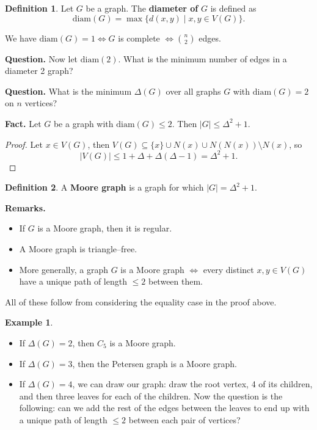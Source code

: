\documentclass{article}
\theoremstyle{definition}
\newtheorem{example}{Example}[section]
\newtheorem{defn}{Definition}[section]
\begin{document}
\begin{defn}
    Let $G$ be a graph. The \textbf{diameter of} $G$ is defined as $$\text{diam}(G) = \max \{d(x,y) \mid x,y \in V(G)\}.$$ 
\end{defn}

We have $\text{diam}(G)=1 \iff G$ is complete $\iff {n\choose{2}}$ edges.
\vspace{1mm}

\textbf{Question.} Now let $\text{diam}(2)$. What is the minimum number of edges in a diameter 2 graph?
\vspace{1mm}

\textbf{Question.} What is the minimum $\Delta(G)$ over all graphs $G$ with $\text{diam}(G)=2$ on $n$ vertices?
\vspace{1mm}

\textbf{Fact.} Let $G$ be a graph with $\text{diam}(G)\le 2$. Then $|G| \le \Delta^2+1$.
\begin{proof}
    Let $x \in V(G)$, then $V(G) \subseteq \{x\} \cup N(x) \cup N(N(x))\setminus N(x)$, so $$|V(G)| \le 1 + \Delta + \Delta(\Delta-1) = \Delta^2+1.$$
\end{proof}
\begin{defn}
    A \textbf{Moore graph} is a graph for which $|G|=\Delta^2+1$.
\end{defn}
\textbf{Remarks.}
\begin{itemize}
    \item If $G$ is a Moore graph, then it is regular.
    \item A Moore graph is triangle--free.
    \item More generally, a graph $G$ is a Moore graph $\iff$ every distinct $x,y \in V(G)$ have a unique path of length $\le 2$ between them. 
\end{itemize} 
All of these follow from considering the equality case in the proof above.
\begin{example}
    \begin{itemize}
        \item If $\Delta(G)=2$, then $C_5$ is a Moore graph.
        \item If $\Delta(G)=3$, then the Petersen graph is a Moore graph.
        \item If $\Delta(G)=4$, we can draw our graph: draw the root vertex, 4 of its children, and then three leaves for each of the children. Now the question is the following: can we add the rest of the edges between the leaves to end up with a unique path of length $\le 2$ between each pair of vertices? 
    \end{itemize}
\end{example}
\end{document}
